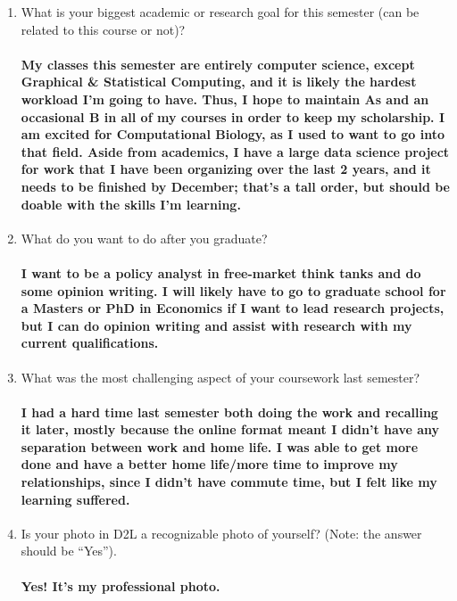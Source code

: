 \documentclass{article}
\begin{document}
\begin{enumerate}
     \item What is your biggest academic or research goal for this semester (can
         be related to this course or not)?

         \paragraph{My classes this semester are entirely computer science, except Graphical & Statistical Computing, and it is likely the hardest workload I'm going to have. Thus, I hope to maintain As and an occasional B in all of my courses in order to keep my scholarship. I am excited for Computational Biology, as I used to want to go into that field. Aside from academics, I have a large data science project for work that I have been organizing over the last 2 years, and it needs to be finished by December; that's a tall order, but should be doable with the skills I'm learning.} \todo{}

     \item What do you want to do after you graduate?

         \paragraph{I want to be a policy analyst in free-market think tanks and do some opinion writing. I will likely have to go to graduate school for a Masters or PhD in Economics if I want to lead research projects, but I can do opinion writing and assist with research with my current qualifications.} \todo{}

     \item What was the most challenging aspect of your coursework last semester?

         \paragraph{I had a hard time last semester both doing the work and recalling it later, mostly because the online format meant I didn't have any separation between work and home life. I was able to get more done and have a better home life/more time to improve my relationships, since I didn't have commute time, but I felt like my learning suffered.} \todo{}

    \item Is your photo in D2L a recognizable photo of yourself?  (Note: the
        answer should be ``Yes'').

         \paragraph{Yes! It's my professional photo.} \todo{}

\end{enumerate}
\end{document}
